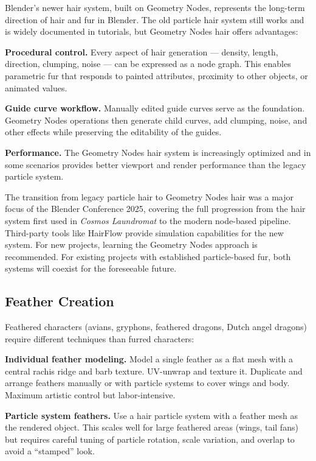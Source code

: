 Blender's newer hair system, built on Geometry Nodes, represents the long-term direction of hair and fur in Blender. The old particle hair system still works and is widely documented in tutorials, but Geometry Nodes hair offers advantages:

\textbf{Procedural control.} Every aspect of hair generation --- density, length, direction, clumping, noise --- can be expressed as a node graph. This enables parametric fur that responds to painted attributes, proximity to other objects, or animated values.

\textbf{Guide curve workflow.} Manually edited guide curves serve as the foundation. Geometry Nodes operations then generate child curves, add clumping, noise, and other effects while preserving the editability of the guides.

\textbf{Performance.} The Geometry Nodes hair system is increasingly optimized and in some scenarios provides better viewport and render performance than the legacy particle system.

\begin{historynote}
The transition from legacy particle hair to Geometry Nodes hair was a major focus of the Blender Conference 2025, covering the full progression from the hair system first used in \emph{Cosmos Laundromat} to the modern node-based pipeline. Third-party tools like HairFlow provide simulation capabilities for the new system. For new projects, learning the Geometry Nodes approach is recommended. For existing projects with established particle-based fur, both systems will coexist for the foreseeable future.
\end{historynote}


\subsection{Feather Creation}

Feathered characters (avians, gryphons, feathered dragons, Dutch angel dragons) require different techniques than furred characters:

\textbf{Individual feather modeling.} Model a single feather as a flat mesh with a central rachis ridge and barb texture. UV-unwrap and texture it. Duplicate and arrange feathers manually or with particle systems to cover wings and body. Maximum artistic control but labor-intensive.

\textbf{Particle system feathers.} Use a hair particle system with a feather mesh as the rendered object. This scales well for large feathered areas (wings, tail fans) but requires careful tuning of particle rotation, scale variation, and overlap to avoid a ``stamped'' look.

